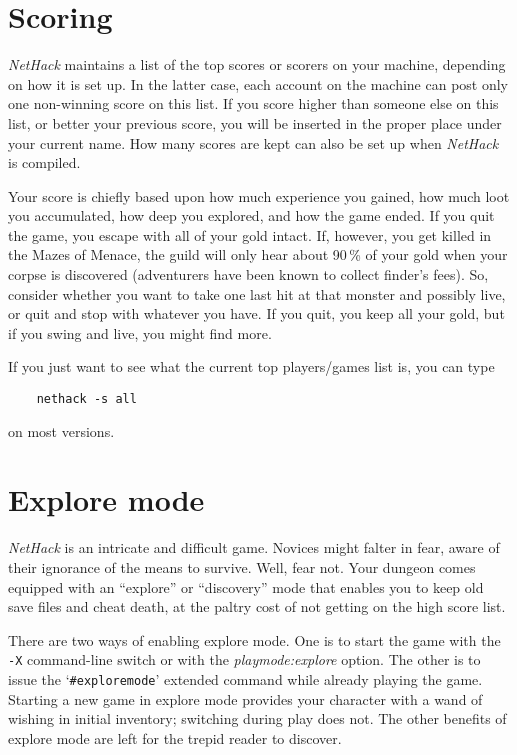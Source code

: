 \section{Scoring}

{\it NetHack\/} maintains a list of the top scores or scorers on your machine,
depending on how it is set up.  In the latter case, each account on
the machine can post only one non-winning score on this list.  If
you score higher than someone else on this list, or better your
previous score, you will be inserted in the proper place under your
current name.  How many scores are kept can also be set up when
{\it NetHack\/} is compiled.

Your score is chiefly based upon how much experience you gained, how
much loot you accumulated, how deep you explored, and how the game
ended.  If you quit the game, you escape with all of your gold intact.
If, however, you get killed in the Mazes of Menace, the guild will
only hear about 90\,\% of your gold when your corpse is discovered
(adventurers have been known to collect finder's fees).  So, consider
whether you want to take one last hit at that monster and possibly
live, or quit and stop with whatever you have.  If you quit, you keep
all your gold, but if you swing and live, you might find more.

If you just want to see what the current top players/games list is, you
can type
\begin{verbatim}
    nethack -s all
\end{verbatim}
on most versions.

\section{Explore mode}

{\it NetHack\/} is an intricate and difficult game.  Novices might falter
in fear, aware of their ignorance of the means to survive.  Well, fear
not.  Your dungeon comes equipped with an ``explore'' or ``discovery''
mode that enables you to keep old save files and cheat death, at the
paltry cost of not getting on the high score list.

There are two ways of enabling explore mode.  One is to start the game
with the {\tt -X}
command-line switch or with the
{\it playmode:explore\/}
option.  The other is to issue the `{\tt \#exploremode}' extended command while
already playing the game.  Starting a new game in explore mode provides your
character with a wand of wishing in initial inventory; switching
during play does not.  The other benefits of explore mode are left for
the trepid reader to discover.

